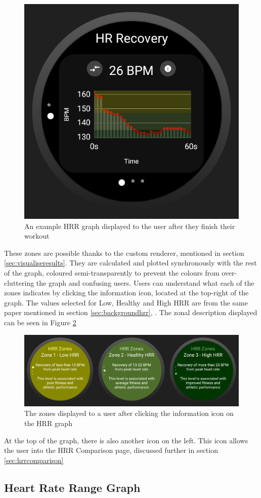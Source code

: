\documentclass{l4proj}
\begin{document}
\begin{figure}[h!]
    \centering
    \includegraphics[width=0.4\linewidth]{dissertation//dissImages/HRRGraph.png}
    \caption{An example HRR graph displayed to the user after they finish their workout}
    \label{fig:hrrgraph}
\end{figure}

These zones are possible thanks to the custom renderer, mentioned in section \ref{sec:visualiseresults}. They are calculated and plotted synchronously with the rest of the graph, coloured semi-transparently to prevent the colours from over-cluttering the graph and confusing users. Users can understand what each of the zones indicates by clicking the information icon, located at the top-right of the graph. The values selected for Low, Healthy and High HRR are from the same paper mentioned in section \ref{sec:backgroundhrr}, \cite{HRR2000}. The zonal description displayed can be seen in Figure \ref{fig:hrrgraphzones}

\begin{figure}[h!]
    \centering
    \includegraphics[width=0.9\linewidth]{dissertation//dissImages/CombinedHRRZones.png}
    \caption{The zones displayed to a user after clicking the information icon on the HRR graph}
    \label{fig:hrrgraphzones}
\end{figure}

At the top of the graph, there is also another icon on the left. This icon allows the user into the HRR Comparison page, discussed further in section \ref{sec:hrrcomparison}

\subsection{Heart Rate Range Graph}
\label{sec:hrrangegraph}
\end{document}
